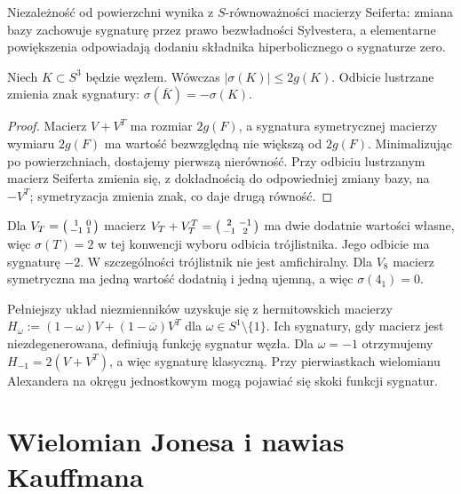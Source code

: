 Niezależność od powierzchni wynika z $S$-równoważności macierzy
Seiferta: zmiana bazy zachowuje sygnaturę przez prawo
bezwładności Sylvestera, a elementarne powiększenia odpowiadają
dodaniu składnika hiperbolicznego o sygnaturze zero.

\begin{stwierdzenie}
Niech $K\subset S^3$ będzie węzłem. Wówczas
$|\sigma(K)|\leq2g(K)$.
Odbicie lustrzane zmienia znak sygnatury:
$\sigma(\overline K)=-\sigma(K)$.
\end{stwierdzenie}

\begin{proof}
Macierz $V+V^T$ ma rozmiar $2g(F)$, a sygnatura symetrycznej
macierzy wymiaru $2g(F)$ ma wartość bezwzględną nie większą
od $2g(F)$. Minimalizując po powierzchniach, dostajemy pierwszą
nierówność. Przy odbiciu lustrzanym macierz Seiferta zmienia się,
z dokładnością do odpowiedniej zmiany bazy, na $-V^T$;
symetryzacja zmienia znak, co daje drugą równość.
\end{proof}

\begin{przyklad}
Dla $V_T=\begin{psmallmatrix}1&0\\-1&1\end{psmallmatrix}$
macierz $V_T+V_T^T=\begin{psmallmatrix}2&-1\\-1&2\end{psmallmatrix}$
ma dwie dodatnie wartości własne, więc $\sigma(T)=2$
w tej konwencji wyboru odbicia trójlistnika. Jego odbicie
ma sygnaturę $-2$. W szczególności trójlistnik nie jest
amfichiralny. Dla $V_8$ macierz symetryczna ma jedną wartość
dodatnią i jedną ujemną, a więc $\sigma(4_1)=0$.
\end{przyklad}

\begin{uwaga}
Pełniejszy układ niezmienników uzyskuje się z hermitowskich
macierzy $H_\omega:=(1-\omega)V+(1-\overline\omega)V^T$
dla $\omega\in S^1\setminus\{1\}$. Ich sygnatury, gdy macierz
jest niezdegenerowana, definiują funkcję sygnatur węzła.
Dla $\omega=-1$ otrzymujemy
$H_{-1}=2(V+V^T)$, a więc sygnaturę klasyczną.
Przy pierwiastkach wielomianu Alexandera na okręgu jednostkowym
mogą pojawiać się skoki funkcji sygnatur.
\end{uwaga}

\section{Wielomian Jonesa i nawias Kauffmana}
\label{sec:kt-jones}

